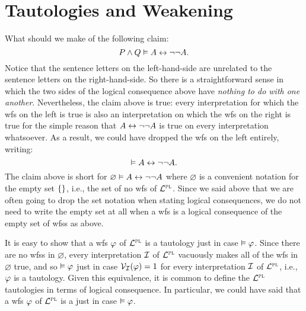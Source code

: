 %
%
%
%




\section{Tautologies and Weakening}
  \label{sec:TautologyWeakening}


What should we make of the following claim:
  $$P\wedge Q \vDash A\leftrightarrow\neg\neg A.$$
Notice that the sentence letters on the left-hand-side are unrelated to the sentence letters on the right-hand-side.
So there is a straightforward sense in which the two sides of the logical consequence above have \emph{nothing to do with one another}.
Nevertheless, the claim above is true: every interpretation for which the wfs on the left is true is also an interpretation on which the wfs on the right is true for the simple reason that $A\leftrightarrow\neg\neg A$ is true on every interpretation whatsoever.
As a result, we could have dropped the wfs on the left entirely, writing:
  $$\vDash A\leftrightarrow\neg\neg A.$$
The claim above is short for $\varnothing\vDash A\leftrightarrow\neg\neg A$ where $\varnothing$ is a convenient notation for the empty set $\lbrace\rbrace$, i.e., the set of no wfs of $\mathcal{L}^{\textsc{pl}}$.
Since we said above that we are often going to drop the set notation when stating logical consequences, we do not need to write the empty set at all when a wfs is a logical consequence of the empty set of wfss as above.

It is easy to show that a wfs $\varphi$ of $\mathcal{L}^{\textsc{pl}}$ is a tautology just in case $\vDash \varphi$. 
Since there are no wfss in $\varnothing$, every interpretation $\mathcal{I}$ of $\mathcal{L}^{\textsc{pl}}$ vacuously makes all of the wfs in $\varnothing$ true, and so $\vDash \varphi$ just in case $\mathcal{V}_{\mathcal{I}}(\varphi) = 1$ for every interpretation $\mathcal{I}$ of $\mathcal{L}^{\textsc{pl}}$, i.e., $\varphi$ is a tautology. 
Given this equivalence, it is common to define the $\mathcal{L}^{\textsc{pl}}$ tautologies in terms of logical consequence.
In particular, we could have said that a wfs $\varphi$ of $\mathcal{L}^{\textsc{pl}}$ is a  just in case $\vDash \varphi$.

